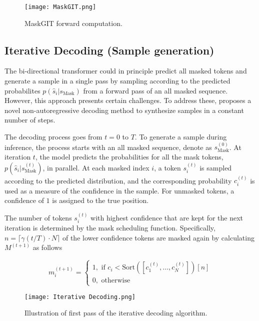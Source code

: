 \documentclass[../../thesis.tex]{subfiles}
\begin{document}
\begin{figure}[h]
    \texttt{[image: MaskGIT.png]}
    \centering 
    \caption{MaskGIT forward computation.}
    \label{fig:MaskGIT}
\end{figure}


\subsection{Iterative Decoding (Sample generation)}

The bi-directional transformer could in principle predict all masked tokens and generate a sample in a single pass by sampling according to the predicted probabilites $p(\widehat{s}_i|s_\text{Mask})$ from a forward pass of an all masked sequence. However, this approach presents certain challenges. To address these, \cite{chang2022maskgit} proposes a novel non-autoregressive decoding method to synthesize samples in a constant number of steps.\newline

The decoding process goes from $t = 0$ to $T$. To generate a sample during inference, the process starts with an all masked sequence, denote as $s_\text{Mask}^{(0)}$. At iteration $t$, the model predicts the probabilities for all the mask tokens, $p(\widehat{s}_i|s_\text{Mask}^{(t)})$, in parallel. At each masked index $i$, a token $s_i^{(t)}$ is sampled according to the predicted distribution, and the corresponding probability $c_i^{(t)}$ is used as a measure of the confidence in the sample. For unmasked tokens, a confidence of $1$ is assigned to the true position.\newline

The number of tokens $s_i^{(t)}$ with highest confidence that are kept for the next iteration is determined by the mask scheduling function. Specifically, $n = \lceil \gamma(t/T)\cdot N \rceil$ of the lower confidence tokens are masked again by calculating $M^{(t+1)}$ as follows

\begin{equation}
    m_i^{(t+1)} = 
    \begin{cases}
        1, \text{ if } c_i < \text{Sort}([c_1^{(t)},\dots,c_N^{(t)}])[n]\\
        0, \text{ otherwise} 
    \end{cases}
\end{equation}

\begin{figure}[h]
    \texttt{[image: Iterative Decoding.png]}
    \centering 
    \caption{Illustration of first pass of the iterative decoding algorithm.}
    \label{fig:IterativeDecoding}
\end{figure}
\end{document}
